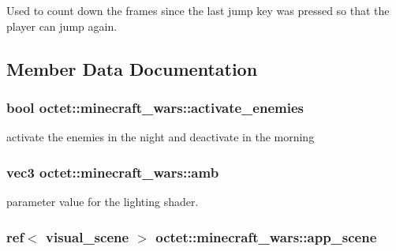 Used to count down the frames since the last jump key was pressed so that the player can jump again. 



\subsection{Member Data Documentation}
\hypertarget{classoctet_1_1minecraft__wars_ae0d291f49dc8f23c1bab8d1bc53b2c5d}{
\subsubsection[{activate\+\_\+enemies}]{\setlength{\rightskip}{0pt plus 5cm}bool octet\+::minecraft\+\_\+wars\+::activate\+\_\+enemies\hspace{0.3cm}{\ttfamily [private]}}}\label{classoctet_1_1minecraft__wars_ae0d291f49dc8f23c1bab8d1bc53b2c5d}


activate the enemies in the night and deactivate in the morning 

\hypertarget{classoctet_1_1minecraft__wars_acfbc3cf4a5d70d3885b38c220c2151ad}{
\subsubsection[{amb}]{\setlength{\rightskip}{0pt plus 5cm}vec3 octet\+::minecraft\+\_\+wars\+::amb\hspace{0.3cm}{\ttfamily [private]}}}\label{classoctet_1_1minecraft__wars_acfbc3cf4a5d70d3885b38c220c2151ad}


parameter value for the lighting shader. 

\hypertarget{classoctet_1_1minecraft__wars_ac96956a574d5aa5a30a84de7e226bd34}{
\subsubsection[{app\+\_\+scene}]{\setlength{\rightskip}{0pt plus 5cm}ref$<$ visual\+\_\+scene $>$ octet\+::minecraft\+\_\+wars\+::app\+\_\+scene\hspace{0.3cm}{\ttfamily [private]}}}\label{classoctet_1_1minecraft__wars_ac96956a574d5aa5a30a84de7e226bd34}


